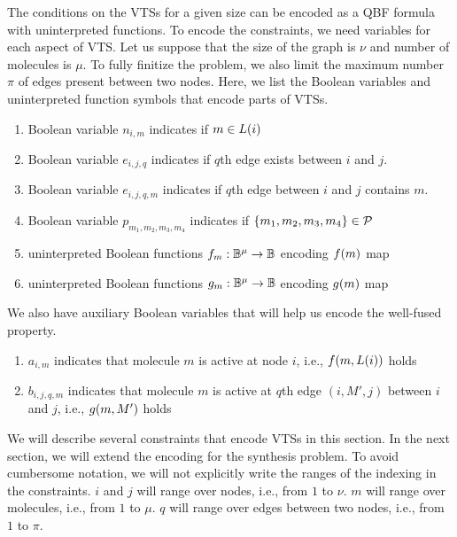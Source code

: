 The conditions on the VTSs for a given size can be encoded as a QBF formula
with uninterpreted functions.
%
To encode the constraints, we need variables for each aspect of
VTS.
%
Let us suppose that the size of the graph is $\nu$ and number of
molecules is $\mu$.
%
To fully finitize the problem, we also limit the maximum number $\pi$
of edges present between two nodes.
%
Here, we list the Boolean variables and uninterpreted function symbols
that encode parts of VTSs.
\begin{enumerate}

\item Boolean variable $n_{i,m}$ indicates if $m \in L(i)$
\item Boolean variable $e_{i,j,q}$ indicates if $q$th edge exists between $i$ and $j$.
\item Boolean variable $e_{i,j,q,m}$ indicates if $q$th edge between $i$ and $j$ contains $m$.
\item Boolean variable $p_{m_1,m_2,m_3,m_4}$ indicates if $\{m_1,m_2,m_3,m_4\} \in \mathcal{P}$
\item uninterpreted Boolean functions $f_m : \mathbb{B}^\mu \rightarrow \mathbb{B}$
encoding $f(m)$ map
\item uninterpreted Boolean functions $g_m : \mathbb{B}^\mu \rightarrow \mathbb{B}$
encoding $g(m)$ map
\end{enumerate}
We also have auxiliary Boolean variables that will help us encode the well-fused property. 
\begin{enumerate}
\item $a_{i,m}$ indicates that molecule $m$ is active at node $i$, i.e., $f(m,L(i))$
  holds
\item $b_{i,j,q,m}$ indicates that molecule $m$ is active at $q$th edge $(i,M',j)$ between $i$ and $j$, i.e., $g(m,M')$ holds
\end{enumerate}

We will describe several constraints that encode VTSs in this section.
%
In the next section, we will extend the encoding for the synthesis problem.
%
To avoid cumbersome notation, we will not explicitly write the ranges
of the indexing in the constraints.
%
$i$ and $j$ will range over nodes, i.e., from $1$ to $\nu$.
%
$m$ will range over molecules, i.e., from $1$ to $\mu$.
%
$q$ will range over edges between two nodes, i.e., from $1$ to $\pi$.
%

